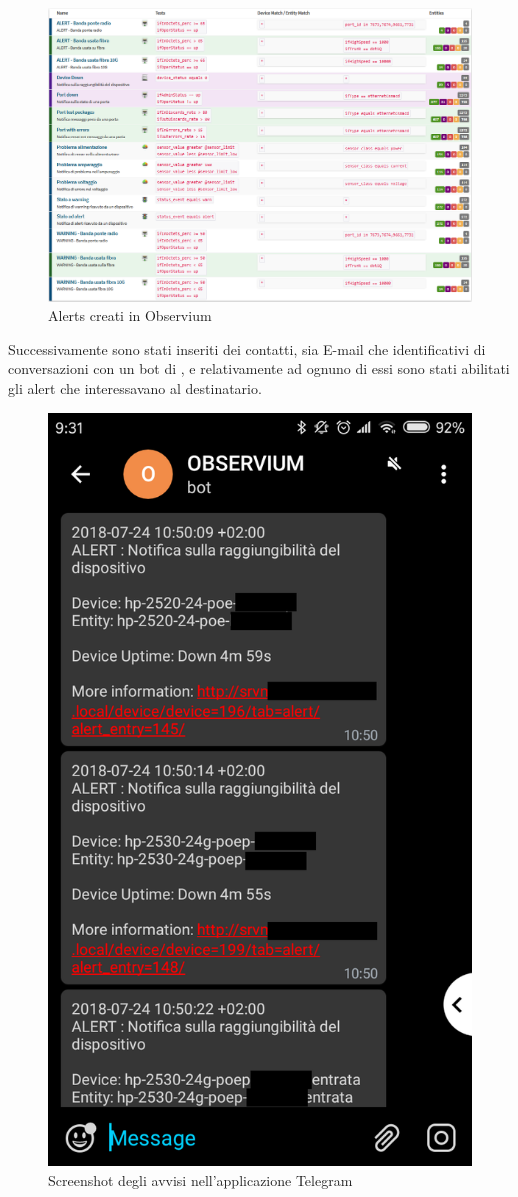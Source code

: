 \documentclass[Realizzazione.tex]{subfiles}
\begin{document}
\begin{figure}[H]
	\centering
	\includegraphics[width=1.1\linewidth]{"images/alerts"}
	\caption{Alerts creati in Observium}
	\label{fig:Alerts creati in Observium}
\end{figure}

Successivamente sono stati inseriti dei contatti, sia E-mail che identificativi di conversazioni con un bot di , e relativamente ad ognuno di essi sono stati abilitati gli alert che interessavano al destinatario.

\begin{figure}[H]
	\centering
	\includegraphics[width=0.5\linewidth]{"images/alerttelegram"}
	\caption{Screenshot degli avvisi nell'applicazione Telegram}
	\label{fig:Screenshot degli avvisi nell'applicazione Telegram}
\end{figure}
\end{document}
